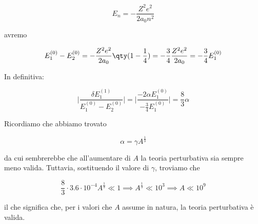 \begin{soluzione}
   \begin{equation*}
      E_n=-\frac{Z^2 e^2}{2 a_0 n^2}
   \end{equation*}

   avremo

   \begin{equation*}
      E_1^{(0)} - E_{2}^{(0)}
      =-\frac{Z^2 e^2}{2 a_0} \qty( 1 - \frac{1}{4} )
      =-\frac{3}{4} \frac{Z^2 e^2}{2 a_0}
      =-\frac{3}{4} E_1^{(0)}
   \end{equation*}

   In definitiva:

   \begin{equation*}
      \biggl| \frac{ \delta E_1^{(1)} }{ E_1^{(0)} - E_{2}^{(0)} } \biggr|
      =\biggl| \frac{ -2 \alpha E_1^{(0)} }{ -\frac{3}{4} E_1^{(0)} } \biggr|
      =\frac{8}{3} \alpha
   \end{equation*}

   Ricordiamo che abbiamo trovato

   \begin{equation*}
      \alpha=\gamma A^{\frac{1}{3}}
   \end{equation*}

   da cui sembrerebbe che all'aumentare di $A$ la teoria perturbativa sia sempre meno valida. Tuttavia, sostituendo il valore di $\gamma$, troviamo che

   \begin{equation*}
      \frac{8}{3} \cdot 3.6 \cdot 10^{-4} A^{\frac{1}{3}} \ll 1
      \implies
      A^{\frac{1}{3}} \ll 10^3
      \implies
      A \ll 10^9
   \end{equation*}

   il che significa che, per i valori che $A$ assume in natura, la teoria perturbativa è valida.
\end{soluzione}

\newpage
\setcounter{equation}{0}

